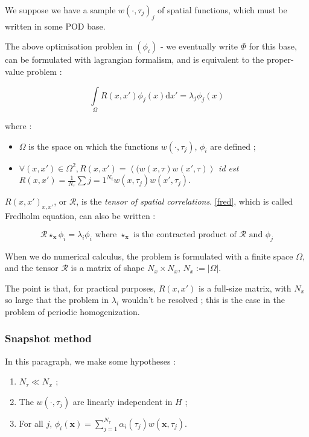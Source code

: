 We suppose we have a sample $w(\cdot,\tau_j)_j$ of spatial functions, which must be written in some POD base.

\par
The above optimisation problen in $(\phi_i)$ - we eventually write $\Phi$ for this base, %
can be formulated with lagrangian formalism, and is equivalent to the proper-value problem :

\begin{equation}\label{fred}
\int\limits_{\Omega}R(x,x')\phi_j (x)\text{d}x'=\lambda_j \phi_j (x)
\end{equation}

where :
\begin{itemize}
\item $\Omega$ is the space on which the functions $w(\cdot ,\tau_j)$, $\phi_i$ are defined ;
\item $\forall (x,x')\in\Omega^2 , R(x,x')=\left\langle(w(x,\tau)w(x',\tau)\right\rangle$ \emph{id est} $R(x,x')=\frac{1}{N_{\tau}}\sum\limits{j=1}^{N_t} w(x,\tau_j)w(x',\tau_j)$.
\end{itemize}

$R(x,x')_{x,x'}$, or $\mathcal{R}$, is the \emph{tensor of spatial correlations}. %
\ref{fred}, which is called Fredholm equation, can also be written :

\[\mathcal{R}\star_{\mathbf{x}}\phi_i=\lambda_i\phi_i\text{ where $\star_{\mathbf{x}}$ is the contracted product of $\mathcal{R}$ and $\phi_j$}\]

\etoile
When we do numerical calculus, the problem is formulated with a finite space $\Omega$, %
and the tensor $\mathcal{R}$ is a matrix of shape $N_x\times N_x$, $N_x :=|\Omega|$.

\par
The point is that, for practical purposes, $R(x,x')$ is a full-size matrix, with $N_x$ so large that the problem in $\lambda_i$ wouldn't be resolved ; %
this is the case in the problem of periodic homogenization.

\subsubsection{Snapshot method}

In this paragraph, we make some hypotheses :

\begin{enumerate}[label=(Snap \arabic*)]
\item\label{hs1} $N_{\tau}\ll N_x$ ;
\item The $w(\cdot , \tau_j)$ are linearly independent in $H$ ;
\item\label{hs3} For all $j$, $\phi_i(\mathbf{x})=\sum\limits_{j=1}^{N_{\tau}}\alpha_i(\tau_j) w(\mathbf{x},\tau_j)$.
\end{enumerate}


